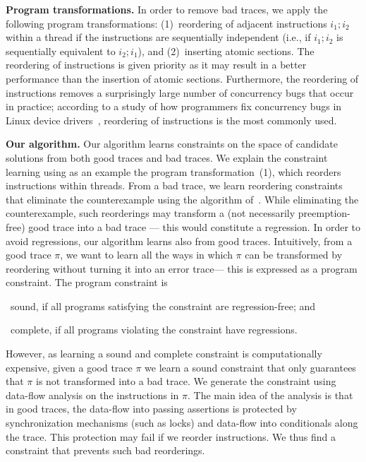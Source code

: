 \documentclass{llncs}
\newcommand\trace{\pi}
\begin{document}
\noindent
{\bf Program transformations.}
In order to remove bad traces, we apply the following program
transformations: (1)~reordering of adjacent instructions $i_1;i_2$ within 
a thread if the instructions are sequentially independent (i.e., if 
$i_1;i_2$ is sequentially equivalent to $i_2;i_1$), and (2)~inserting
atomic sections. 
The reordering of instructions is given priority as it may result in a 
better performance than the insertion of atomic sections. Furthermore, 
the reordering of instructions removes a surprisingly large number of
concurrency bugs that occur in practice; according to a study of how
programmers fix concurrency bugs in Linux device drivers~\cite{cav2013},
reordering of instructions is the most commonly used.  


\noindent
{\bf Our algorithm.}
Our algorithm learns constraints on the space of candidate solutions
from both good traces and bad traces.
We explain the constraint learning using as an example the program 
transformation~(1), which reorders instructions within threads. 
From a bad trace, we learn reordering constraints that eliminate 
the counterexample using the algorithm of~\cite{cav2013}.  
While eliminating the counterexample, such reorderings may transform a
(not necessarily preemption-free) good trace 
into a bad trace
--- this would constitute a regression.
In order to avoid regressions, our algorithm learns also from 
good traces. 
Intuitively, from a good trace $\trace$, we want to learn all the ways 
in which $\trace$ can be transformed by reordering without turning it into
an error trace--- this is expressed as a program constraint.
The program constraint is
\begin{inparaenum}[(a)]
\item~sound, if all programs satisfying the constraint are
  regression-free; and
\item~complete, if all programs violating the constraint have
  regressions.
\end{inparaenum}
However, as learning a sound and complete constraint is
computationally expensive, given a good trace $\trace$ we learn a sound
constraint that only guarantees that $\trace$ is not transformed into a
bad trace. We generate the constraint using data-flow analysis
on the instructions in $\trace$. The main idea of the 
analysis is that in good traces, the data-flow into passing assertions
is protected by synchronization mechanisms (such as locks) and data-flow
into conditionals along the trace. 
This protection may fail if we reorder instructions. We thus find
a constraint that prevents such bad reorderings. 
 
\end{document}

